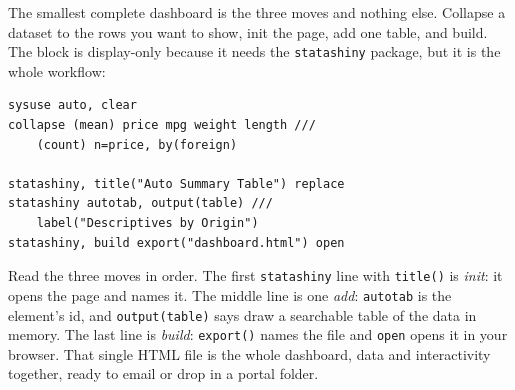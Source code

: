 The smallest complete dashboard is the three moves and nothing else. Collapse a dataset to the rows you want to show, init the page, add one table, and build. The block is display-only because it needs the \texttt{statashiny} package, but it is the whole workflow:
\par
{\footnotesize
\begin{verbatim}
sysuse auto, clear
collapse (mean) price mpg weight length ///
    (count) n=price, by(foreign)

statashiny, title("Auto Summary Table") replace
statashiny autotab, output(table) ///
    label("Descriptives by Origin")
statashiny, build export("dashboard.html") open
\end{verbatim}
}
Read the three moves in order. The first \texttt{statashiny} line with \texttt{title()} is \emph{init}: it opens the page and names it. The middle line is one \emph{add}: \texttt{autotab} is the element's id, and \texttt{output(table)} says draw a searchable table of the data in memory. The last line is \emph{build}: \texttt{export()} names the file and \texttt{open} opens it in your browser. That single HTML file is the whole dashboard, data and interactivity together, ready to email or drop in a portal folder.

